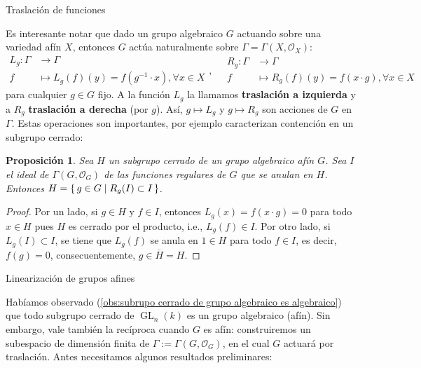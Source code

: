 \documentclass[spanish,10pt]{amsart}
\makeatletter
\renewcommand\subsection{\@startsection{subsection}{2}%
  \z@{.5\linespacing\@plus.7\linespacing}{-.5em}%
  {\normalfont\sffamily}}
\newtheorem{proposition}[theorem]{Proposición}
\theoremstyle{definition}
\theoremstyle{remark}
\numberwithin{equation}{section}
\renewcommand{\bar}[1]{\overline{#1}}
\renewcommand{\O}{\mathcal{O}}
\makeatother
\begin{document}
\subsection{Traslación de funciones}

Es interesante notar que dado un grupo algebraico $G$ actuando sobre una variedad afín $X$, entonces $G$ actúa naturalmente sobre $\Gamma = \Gamma (X, \O_X)$:
\[
    \begin{array}{rl}
    L_g : \Gamma &\longrightarrow \Gamma \\
f &\longmapsto L_g (f) (y) = f(g^{-1} \cdot x) , \forall x \in X
    \end{array}, \quad
    \begin{array}{rl}
    R_g : \Gamma &\longrightarrow \Gamma \\
f &\longmapsto R_g (f) (y) = f(x \cdot g) , \forall x \in X
    \end{array}
\]
para cualquier $g \in G$ fijo. A la función $L_g$ la llamamos \textbf{traslación a izquierda} y a $R_g$ \textbf{traslación a derecha} (por $g$). Así, $g \mapsto L_g$ y $g \mapsto R_g$ son acciones de $G$ en $\Gamma$. Estas operaciones son importantes, por ejemplo caracterizan contención en un subgrupo cerrado:

\begin{proposition}\label{proposition:sea H subgrupo cerrado de grupo algebraico afin G entonces el ideal I de las funciones que se anulan en H determina H por traslacion}
Sea $H$ un subgrupo cerrado de un grupo algebraico afín $G$. Sea $I$ el ideal de $\Gamma (G, \O_G)$ de las funciones regulares de $G$ que se anulan en $H$. Entonces $H = \set{g \in G | R_g (I) \subset I}$.
\end{proposition}
\begin{proof}
Por un lado, si $g \in H$ y $f \in I$, entonces $L_g (x) = f(x \cdot g) = 0$ para todo $x \in H$ pues $H$ es cerrado por el producto, i.e., $L_g (f) \in I$. Por otro lado, si $L_g (I) \subset I$, se tiene que $L_g (f)$ se anula en $1 \in H$ para todo $f \in I$, es decir, $f(g) = 0$, consecuentemente, $g \in \bar H = H$.
\end{proof}



\subsection{Linearización de grupos afines}

Habíamos observado (\ref{obs:subrupo cerrado de grupo algebraico es algebraico}) que todo subgrupo cerrado de $\operatorname{GL}_n (k)$ es un grupo algebraico (afín). Sin embargo, vale también la recíproca cuando $G$ es afín: construiremos un subespacio de dimensión finita de $\Gamma := \Gamma (G, \O_G)$, en el cual $G$ actuará por traslación. Antes necesitamos algunos resultados preliminares:
\end{document}
